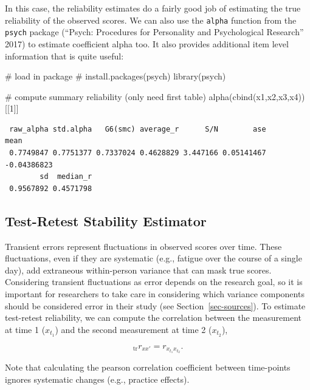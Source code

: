 \documentclass[
  letterpaper,
  DIV=11,
  numbers=noendperiod]{scrreprt}
\newenvironment{Shaded}{\begin{snugshade}}{\end{snugshade}}
\newcommand{\CommentTok}[1]{\textcolor[rgb]{0.37,0.37,0.37}{#1}}
\newcommand{\DecValTok}[1]{\textcolor[rgb]{0.68,0.00,0.00}{#1}}
\newcommand{\FunctionTok}[1]{\textcolor[rgb]{0.28,0.35,0.67}{#1}}
\newcommand{\NormalTok}[1]{\textcolor[rgb]{0.00,0.23,0.31}{#1}}
\begin{document}
In this case, the reliability estimates do a fairly good job of
estimating the true reliability of the observed scores. We can also use
the \texttt{alpha} function from the \texttt{psych} package ({``Psych:
Procedures for Personality and Psychological Research''} 2017) to
estimate coefficient alpha too. It also provides additional item level
information that is quite useful:

\begin{Shaded}
\begin{Highlighting}[]
\CommentTok{\# load in package}
\CommentTok{\# install.packages(\textquotesingle{}psych\textquotesingle{})}
\FunctionTok{library}\NormalTok{(psych)}

\CommentTok{\# compute summary reliability (only need first table)}
\FunctionTok{alpha}\NormalTok{(}\FunctionTok{cbind}\NormalTok{(x1,x2,x3,x4))[[}\DecValTok{1}\NormalTok{]]}
\end{Highlighting}
\end{Shaded}

\begin{verbatim}
 raw_alpha std.alpha   G6(smc) average_r      S/N        ase        mean
 0.7749847 0.7751377 0.7337024 0.4628829 3.447166 0.05141467 -0.04386823
        sd  median_r
 0.9567892 0.4571798
\end{verbatim}

\hypertarget{test-retest-stability-estimator}{%
\subsection{Test-Retest Stability
Estimator}\label{test-retest-stability-estimator}}

Transient errors represent fluctuations in observed scores over time.
These fluctuations, even if they are systematic (e.g., fatigue over the
course of a single day), add extraneous within-person variance that can
mask true scores. Considering transient fluctuations as error depends on
the research goal, so it is important for researchers to take care in
considering which variance components should be considered error in
their study (see Section~\ref{sec-sources}). To estimate test-retest
reliability, we can compute the correlation between the measurement at
time 1 (\(x_{t_1}\)) and the second measurement at time 2 (\(x_{t_2}\)),

\[
_\text{tr}r_{xx'}= r_{x_{t_1}x_{t_2}}.
\]

Note that calculating the pearson correlation coefficient between
time-points ignores systematic changes (e.g., practice effects).
\end{document}
